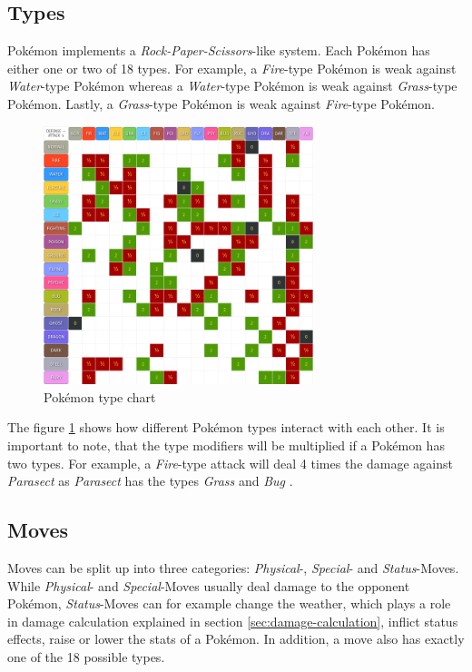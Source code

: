 \subsection{Types}
\label{sec:types}
Pokémon implements a \textit{Rock-Paper-Scissors}-like system. Each Pokémon has either one or two of 
18 types. For example, a \textit{Fire}-type Pokémon is weak against \textit{Water}-type Pokémon
whereas a \textit{Water}-type Pokémon is weak against \textit{Grass}-type Pokémon. Lastly,
a \textit{Grass}-type Pokémon is weak against \textit{Fire}-type Pokémon. 
\begin{figure}
	\centering
	\includegraphics[width=0.7\textwidth]{images/type_chart.png}
	\caption{Pokémon type chart \cite{Pokemondb:Type}}
	\label{fig:type_chart}
\end{figure}
The figure \ref{fig:type_chart} shows how different Pokémon types interact with each other. It is important
to note, that the type modifiers will be multiplied if a Pokémon has two types. For example, a \textit{Fire}-type
attack will deal 4 times the damage against \textit{Parasect} as \textit{Parasect} has the types \textit{Grass} and
\textit{Bug} \cite{Veekun:Parasect}.

\subsection{Moves}
\label{sec:moves}
Moves can be split up into three categories: \textit{Physical}-, \textit{Special}- and \textit{Status}-Moves.
While \textit{Physical}- and \textit{Special}-Moves usually deal damage to the opponent Pokémon, 
\textit{Status}-Moves can for example change the weather, which plays a role in damage calculation explained
in section \ref{sec:damage-calculation}, inflict status effects, raise or lower the stats of a Pokémon. In 
addition, a move also has exactly one of the 18 possible types.

